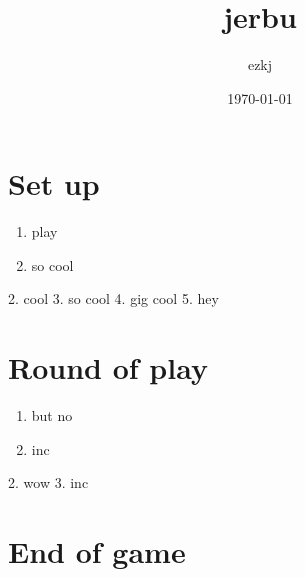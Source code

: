 \documentclass{article}%
\title{jerbu}%
\author{ezkj}%
\date{\today}%
\begin{document}
%
\pagestyle{empty}%
\normalsize%
\maketitle%
\section{ Set up
}%
\label{sec:Setup}%
\begin{enumerate}%
\item%
 play
%
\item%
 so cool
%
\end{enumerate}%
2. cool
%
3. so cool
%
4. gig cool
%
5. hey


%
\section{ Round of play
}%
\label{sec:Roundofplay}%
\begin{enumerate}%
\item%
 but no
%
\item%
 inc
%
\end{enumerate}%
2. wow
%
3. inc


%
\section{ End of game}%
\label{sec:Endofgame}%

%
\end{document}
